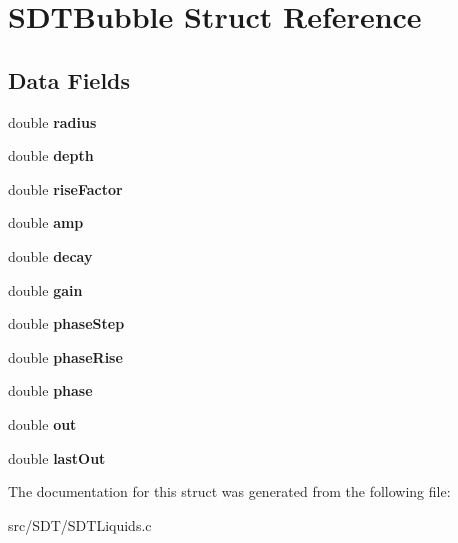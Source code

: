 \hypertarget{struct_s_d_t_bubble}{}\section{S\+D\+T\+Bubble Struct Reference}
\label{struct_s_d_t_bubble}
\subsection*{Data Fields}
\begin{DoxyCompactItemize}
\item 
\hypertarget{struct_s_d_t_bubble_a3f67c53b80389c5f53961936edba04c9}{}double {\bfseries radius}\label{struct_s_d_t_bubble_a3f67c53b80389c5f53961936edba04c9}

\item 
\hypertarget{struct_s_d_t_bubble_a6153a438c3d8d1be934e19e97e58c60c}{}double {\bfseries depth}\label{struct_s_d_t_bubble_a6153a438c3d8d1be934e19e97e58c60c}

\item 
\hypertarget{struct_s_d_t_bubble_ae622d0f01b7e8bf1f3f56a4c46452ed9}{}double {\bfseries rise\+Factor}\label{struct_s_d_t_bubble_ae622d0f01b7e8bf1f3f56a4c46452ed9}

\item 
\hypertarget{struct_s_d_t_bubble_a18169e9f248b43386608618d6076ae24}{}double {\bfseries amp}\label{struct_s_d_t_bubble_a18169e9f248b43386608618d6076ae24}

\item 
\hypertarget{struct_s_d_t_bubble_ab01a33c3f845cc963c97a17973b4e871}{}double {\bfseries decay}\label{struct_s_d_t_bubble_ab01a33c3f845cc963c97a17973b4e871}

\item 
\hypertarget{struct_s_d_t_bubble_ac7b389a0254ed87600f959a5f6d58ab0}{}double {\bfseries gain}\label{struct_s_d_t_bubble_ac7b389a0254ed87600f959a5f6d58ab0}

\item 
\hypertarget{struct_s_d_t_bubble_a0f3355a8a419c4018165d8ddb345f22b}{}double {\bfseries phase\+Step}\label{struct_s_d_t_bubble_a0f3355a8a419c4018165d8ddb345f22b}

\item 
\hypertarget{struct_s_d_t_bubble_a0a64b7f5bbcc31b058cd4748099b3421}{}double {\bfseries phase\+Rise}\label{struct_s_d_t_bubble_a0a64b7f5bbcc31b058cd4748099b3421}

\item 
\hypertarget{struct_s_d_t_bubble_a1c9de474c0c47316b53ae755957f90e2}{}double {\bfseries phase}\label{struct_s_d_t_bubble_a1c9de474c0c47316b53ae755957f90e2}

\item 
\hypertarget{struct_s_d_t_bubble_af6f4cafc00cee94f00e07fce79a1e1d9}{}double {\bfseries out}\label{struct_s_d_t_bubble_af6f4cafc00cee94f00e07fce79a1e1d9}

\item 
\hypertarget{struct_s_d_t_bubble_ab35b1634d5671b06d9750e5e80945623}{}double {\bfseries last\+Out}\label{struct_s_d_t_bubble_ab35b1634d5671b06d9750e5e80945623}

\end{DoxyCompactItemize}


The documentation for this struct was generated from the following file\+:\begin{DoxyCompactItemize}
\item 
src/\+S\+D\+T/S\+D\+T\+Liquids.\+c\end{DoxyCompactItemize}
